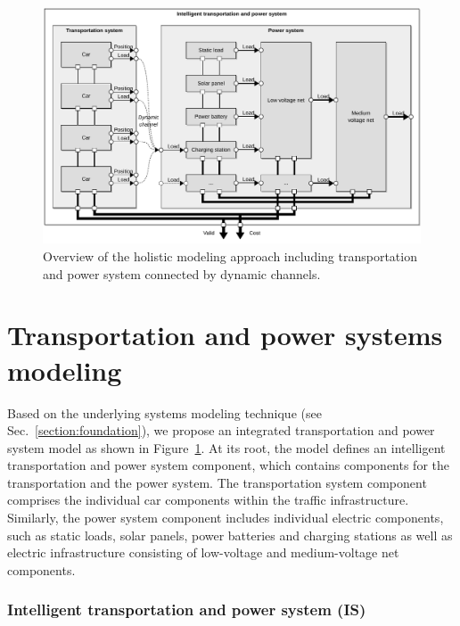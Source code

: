 \begin{figure}[b]
	\centering
	\includegraphics[width=\textwidth]{../gfx/model.pdf}
	\caption{Overview of the holistic modeling approach including transportation and power system connected by dynamic channels.}
	\label{fig:model}
\end{figure}

\section{Transportation and power systems modeling}
\label{section:contribution}

Based on the underlying systems modeling technique (see Sec.~\ref{section:foundation}), we propose an integrated transportation and power system model as shown in Figure~\ref{fig:model}. At its root, the model defines an intelligent transportation and power system component, which contains components for the transportation and the power system. The transportation system component comprises the individual car components within the traffic infrastructure. Similarly, the power system component includes individual electric components, such as static loads, solar panels, power batteries and charging stations as well as electric infrastructure consisting of low-voltage and medium-voltage net components. 

\subsubsection*{Intelligent transportation and power system (IS)}
\label{section:intelligent_system}

